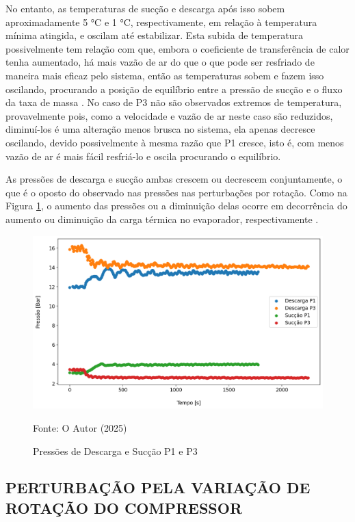 No entanto, as temperaturas de sucção e descarga após isso sobem aproximadamente 5 °C  e 1 °C, respectivamente, em relação à temperatura mínima atingida, e oscilam até estabilizar. Esta subida de temperatura possivelmente tem relação com que, embora o coeficiente de transferência de calor tenha aumentado, há mais vazão de ar do que o que pode ser resfriado de maneira mais eficaz pelo sistema, então as temperaturas sobem e fazem isso oscilando, procurando a posição de equilíbrio entre a pressão de sucção e o fluxo da taxa de massa \cite{StoekerRefrigeration}.  
\newpage
No caso de P3 não são observados extremos de temperatura, provavelmente pois, como a velocidade e vazão de ar neste caso são reduzidos, diminuí-los é uma alteração menos brusca no sistema, ela apenas decresce oscilando, devido possivelmente à mesma razão que P1 cresce, isto é, com menos vazão de ar é mais fácil resfriá-lo e oscila procurando o equilíbrio.

As pressões de descarga e sucção ambas crescem ou decrescem conjuntamente, o que é o oposto do observado nas pressões nas perturbações por rotação. Como na Figura \ref{fig:Pressões de Sucção e Descarga P1 e P3}, o aumento das pressões ou a diminuição delas ocorre em decorrência do aumento ou diminuição da carga térmica no evaporador, respectivamente \cite{EffectsOFRefrigeranteCompressorAirFlow}.

\begin{figure}[h]
    \centering
    \includegraphics[width=1\linewidth]{FigurasdoTexto/Pressões de Sucção e Descarga P1 e P3.png}
    \caption{Pressões de Descarga e Sucção P1 e P3}
    \label{fig:Pressões de Sucção e Descarga P1 e P3}
    {\footnotesize Fonte: O Autor (2025)}
\end{figure}
\newpage
\subsection{\MakeUppercase{Perturbação pela Variação de Rotação do Compressor}}\label{subsec:PertubaçãoRotacaoCompressor}


